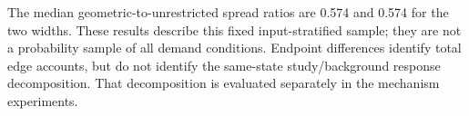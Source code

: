 The median geometric-to-unrestricted spread ratios are 0.574 and 0.574 for the two widths. These results describe this fixed input-stratified sample; they are not a probability sample of all demand conditions. Endpoint differences identify total edge accounts, but do not identify the same-state study/background response decomposition. That decomposition is evaluated separately in the mechanism experiments.
